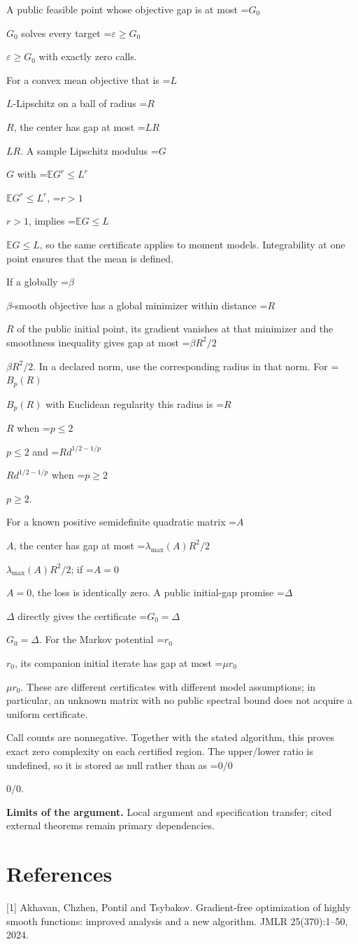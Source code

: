 \documentclass[10pt,a4paper]{article}
\newcommand{\AtlasMath}[1]{\par\begingroup\centering\setbox0=\hbox{$\displaystyle #1$}\ifdim\wd0>1.4\linewidth\typeout{ATLAS WIDE FORMULA: \the\wd0}\fi\ifdim\wd0>\linewidth\resizebox{\linewidth}{!}{\box0}\else\box0\fi\par\endgroup}
\newcommand{\AtlasInlineMath}[1]{\begingroup\setbox0=\hbox{$#1$}\ifdim\wd0>.4\linewidth\endgroup\AtlasMath{#1}\else\endgroup$#1$\fi}
\begin{document}
A public feasible point whose objective gap is at most \AtlasInlineMath{G_0} solves every target \AtlasInlineMath{\varepsilon\ge G_0} with exactly zero calls.

For a convex mean objective that is \AtlasInlineMath{L}-Lipschitz on a ball of radius \AtlasInlineMath{R}, the center has gap at most \AtlasInlineMath{LR}. A sample Lipschitz modulus \AtlasInlineMath{G} with \AtlasInlineMath{\mathbb E G^r\le L^r}, \AtlasInlineMath{r>1}, implies \AtlasInlineMath{\mathbb E G\le L}, so the same certificate applies to moment models. Integrability at one point ensures that the mean is defined.

If a globally \AtlasInlineMath{\beta}-smooth objective has a global minimizer within distance \AtlasInlineMath{R} of the public initial point, its gradient vanishes at that minimizer and the smoothness inequality gives gap at most \AtlasInlineMath{\beta R^2/2}. In a declared norm, use the corresponding radius in that norm. For \AtlasInlineMath{B_p(R)} with Euclidean regularity this radius is \AtlasInlineMath{R} when \AtlasInlineMath{p\le2} and \AtlasInlineMath{R d^{1/2-1/p}} when \AtlasInlineMath{p\ge2}.

For a known positive semidefinite quadratic matrix \AtlasInlineMath{A}, the center has gap at most \AtlasInlineMath{\lambda_{\max}(A)R^2/2}; if \AtlasInlineMath{A=0}, the loss is identically zero. A public initial-gap promise \AtlasInlineMath{\Delta} directly gives the certificate \AtlasInlineMath{G_0=\Delta}. For the Markov potential \AtlasInlineMath{r_0}, its companion initial iterate has gap at most \AtlasInlineMath{\mu r_0}. These are different certificates with different model assumptions; in particular, an unknown matrix with no public spectral bound does not acquire a uniform certificate.

Call counts are nonnegative. Together with the stated algorithm, this proves exact zero complexity on each certified region. The upper/lower ratio is undefined, so it is stored as null rather than as \AtlasInlineMath{0/0}.

\textbf{Limits of the argument.} Local argument and specification transfer; cited external theorems remain primary dependencies.

\section{References}
[1] Akhavan, Chzhen, Pontil and Tsybakov. Gradient-free optimization of highly smooth functions: improved analysis and a new algorithm. JMLR 25(370):1--50, 2024.
\end{document}
